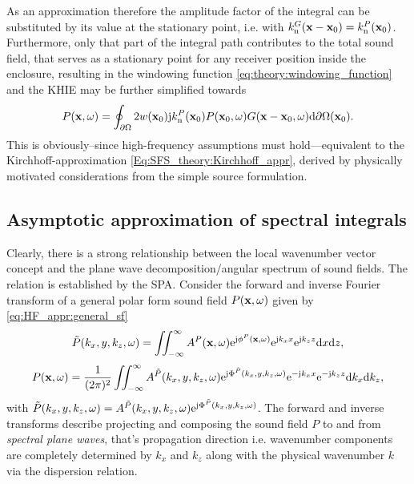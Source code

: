 As an approximation therefore the amplitude factor of the integral can be substituted by its value at the stationary point, i.e. with $k_{\mathrm{n}}^G(\mathbf{x}-\mathbf{x}_0) = k_{\mathrm{n}}^P(\mathbf{x}_0)$.
Furthermore, only that part of the integral path contributes to the total sound field, that serves as a stationary point for any receiver position inside the enclosure,
resulting in the windowing function \eqref{eq:theory:windowing_function} and the KHIE may be further simplified towards
\begin{equation}
P(\mathbf{x},\omega) = 
\oint_{\partial \Omega} 
2 w(\mathbf{x}_0) \mathrm{j} k_{\mathrm{n}}^P(\mathbf{x}_0) 
P(\mathbf{x}_0,\omega) G(\mathbf{x}-\mathbf{x}_0,\omega)  \mathrm{d} \partial \Omega( \mathbf{x}_0).
\label{Eq:HF_appr:Kirchhoff_approximation}
\end{equation}
This is obviously--since high-frequency assumptions must hold---equivalent to the Kirchhoff-approximation \eqref{Eq:SFS_theory:Kirchhoff_appr}, derived by physically motivated considerations from the simple source formulation.

\subsection{Asymptotic approximation of spectral integrals}
\label{Sec:SPA_for_Fourier}
Clearly, there is a strong relationship between the local wavenumber vector concept and the plane wave decomposition/angular spectrum of sound fields.
The relation is established by the SPA.
Consider the forward and inverse Fourier transform of a general polar form sound field $P(\mathbf{x},\omega)$ given by \eqref{eq:HF_appr:general_sf}
\begin{equation}
\tilde{P}(k_x,y,k_z,\omega) = \iint_{-\infty}^{\infty} A^P(\mathbf{x},\omega)\mathrm{e}^{\mathrm{j} \phi^P(\mathbf{x},\omega)} \mathrm{e}^{\mathrm{j} k_x x} \mathrm{e}^{\mathrm{j} k_z z} \mathrm{d} x \mathrm{d} z,
\label{eq:forward_transform}
\end{equation}
\begin{equation}
P(\mathbf{x},\omega) = \frac{1}{(2\pi)^2} \iint_{-\infty}^{\infty} A^{\tilde{P}}(k_x,y,k_z,\omega)\mathrm{e}^{\mathrm{j} \Phi^{\tilde{P}}(k_x,y,k_z,\omega)}  \mathrm{e}^{-\mathrm{j} k_x x} \mathrm{e}^{-\mathrm{j} k_z z} \mathrm{d} k_x \mathrm{d} k_z,
\label{eq:inverse_transform}
\end{equation}
with $\tilde{P}(k_x,y,k_z,\omega) = A^{\tilde{P}}(k_x,y,k_z,\omega)\mathrm{e}^{\mathrm{j} \Phi^{\tilde{P}}(k_x,y,k_z,\omega)}$.
The forward and inverse transforms describe projecting and composing the sound field $P$ to and from \emph{spectral plane waves}, that's propagation direction i.e. wavenumber components are completely determined by $k_x$ and $k_z$ along with the physical wavenumber $k$ via the dispersion relation.

